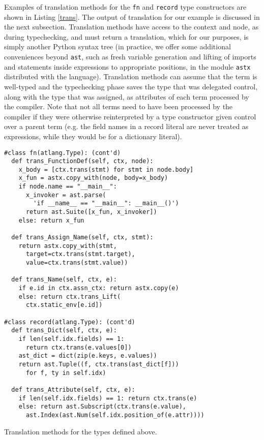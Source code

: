 \documentclass[9pt]{sigplanconf}
\newcommand{\lstinlinep}[1]{\lstinline[language=Python,basicstyle=\ttfamily\small,deletendkeywords={tuple,buffer,map}]{#1}}
\begin{document}
Examples of translation methods for the \lstinlinep{fn} and \lstinlinep{record} type constructors are shown in Listing \ref{trans}. The output of translation for our example is discussed in the next subsection. Translation methods have access to the context and node, as during typechecking, and must return a translation, which for our purposes, is simply another Python syntax tree (in practice, we offer some additional conveniences beyond \lstinlinep{ast}, such as fresh variable generation and lifting of imports and statements inside expressions to appropriate positions, in the module \lstinlinep{astx} distributed with the language). Translation methods can assume that the term is well-typed and the typechecking phase saves the type that was delegated control, along with the type that was assigned, as attributes of each term processed by the compiler. Note that not all terms need to have been processed by the compiler if they were otherwise reinterpreted by a type constructor given control over a parent term (e.g. the field names in a record literal are never treated as expressions, while they would be for a dictionary literal). %
\begin{codelisting}[t]
\begin{lstlisting}
#class fn(atlang.Type): (cont'd)
  def trans_FunctionDef(self, ctx, node):
    x_body = [ctx.trans(stmt) for stmt in node.body]
    x_fun = astx.copy_with(node, body=x_body)
    if node.name == "__main__": 
      x_invoker = ast.parse(
        'if __name__ == "__main__": __main__()')
      return ast.Suite([x_fun, x_invoker])
    else: return x_fun
  
  def trans_Assign_Name(self, ctx, stmt):
    return astx.copy_with(stmt, 
      target=ctx.trans(stmt.target), 
      value=ctx.trans(stmt.value))
    
  def trans_Name(self, ctx, e):
    if e.id in ctx.assn_ctx: return astx.copy(e)
    else: return ctx.trans_Lift(
      ctx.static_env[e.id])
    
#class record(atlang.Type): (cont'd)
  def trans_Dict(self, ctx, e): 
    if len(self.idx.fields) == 1: 
      return ctx.trans(e.values[0])
    ast_dict = dict(zip(e.keys, e.values))
    return ast.Tuple((f, ctx.trans(ast_dict[f]))
      for f, ty in self.idx)

  def trans_Attribute(self, ctx, e):
    if len(self.idx.fields) == 1: return ctx.trans(e)
    else: return ast.Subscript(ctx.trans(e.value), 
      ast.Index(ast.Num(self.idx.position_of(e.attr))))
\end{lstlisting}
\caption{Translation methods for the types defined above.}
\label{trans}
\end{codelisting}
\end{document}
